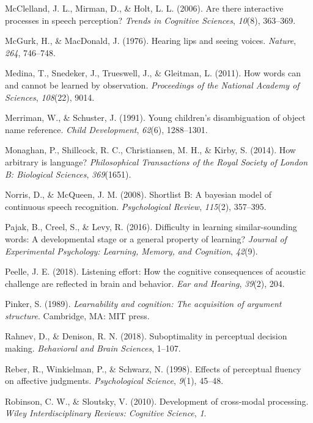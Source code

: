 \documentclass[english,floatsintext,man]{apa6}
\theoremstyle{definition}
\theoremstyle{definition}
\theoremstyle{definition}
\theoremstyle{remark}
\begin{document}
\hypertarget{ref-mcclelland2006}{}
McClelland, J. L., Mirman, D., \& Holt, L. L. (2006). Are there
interactive processes in speech perception? \emph{Trends in Cognitive
Sciences}, \emph{10}(8), 363--369.

\hypertarget{ref-mcgurk1976}{}
McGurk, H., \& MacDonald, J. (1976). Hearing lips and seeing voices.
\emph{Nature}, \emph{264}, 746--748.

\hypertarget{ref-medina2011}{}
Medina, T., Snedeker, J., Trueswell, J., \& Gleitman, L. (2011). How
words can and cannot be learned by observation. \emph{Proceedings of the
National Academy of Sciences}, \emph{108}(22), 9014.

\hypertarget{ref-Merriman91}{}
Merriman, W., \& Schuster, J. (1991). Young children's disambiguation of
object name reference. \emph{Child Development}, \emph{62}(6),
1288--1301.

\hypertarget{ref-Monaghan2014}{}
Monaghan, P., Shillcock, R. C., Christiansen, M. H., \& Kirby, S.
(2014). How arbitrary is language? \emph{Philosophical Transactions of
the Royal Society of London B: Biological Sciences}, \emph{369}(1651).

\hypertarget{ref-Norris08}{}
Norris, D., \& McQueen, J. M. (2008). Shortlist B: A bayesian model of
continuous speech recognition. \emph{Psychological Review},
\emph{115}(2), 357--395.

\hypertarget{ref-pajak2016}{}
Pajak, B., Creel, S., \& Levy, R. (2016). Difficulty in learning
similar-sounding words: A developmental stage or a general property of
learning? \emph{Journal of Experimental Psychology: Learning, Memory,
and Cognition}, \emph{42}(9).

\hypertarget{ref-peelle2018}{}
Peelle, J. E. (2018). Listening effort: How the cognitive consequences
of acoustic challenge are reflected in brain and behavior. \emph{Ear and
Hearing}, \emph{39}(2), 204.

\hypertarget{ref-pinker1989}{}
Pinker, S. (1989). \emph{Learnability and cognition: The acquisition of
argument structure}. Cambridge, MA: MIT press.

\hypertarget{ref-rahnev2018}{}
Rahnev, D., \& Denison, R. N. (2018). Suboptimality in perceptual
decision making. \emph{Behavioral and Brain Sciences}, 1--107.

\hypertarget{ref-reber98}{}
Reber, R., Winkielman, P., \& Schwarz, N. (1998). Effects of perceptual
fluency on affective judgments. \emph{Psychological Science},
\emph{9}(1), 45--48.

\hypertarget{ref-robinson2010}{}
Robinson, C. W., \& Sloutsky, V. (2010). Development of cross-modal
processing. \emph{Wiley Interdisciplinary Reviews: Cognitive Science},
\emph{1}.
\end{document}
